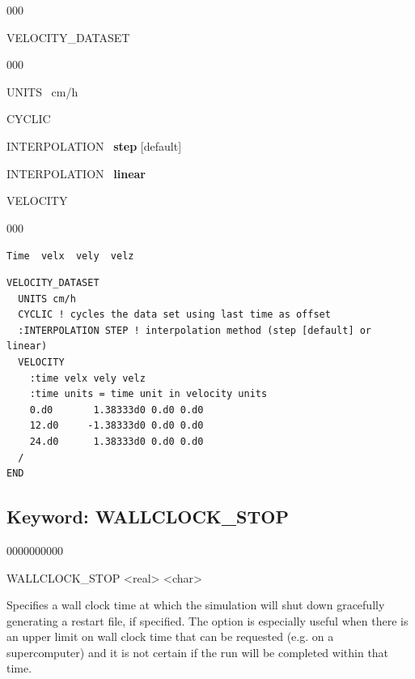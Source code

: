 \documentclass[12pt]{article}
\begin{document}
\begin{deflist}{000}
\item[VELOCITY\_DATASET] ~
\begin{deflist}{000}
\item[UNITS] \ cm/h
\item[CYCLIC]
\item[INTERPOLATION] \ {\bf step} [default]
\item[INTERPOLATION] \ {\bf linear}
\item[VELOCITY] ~
\begin{deflist}{000}
\item[{\tt Time \ velx \ vely \ velz}]
\end{deflist}
\item[\keyend]
\end{deflist}
\item[\keyend]
\end{deflist}


\begin{mdframed}

\begin{verbatim}
VELOCITY_DATASET
  UNITS cm/h
  CYCLIC ! cycles the data set using last time as offset
  :INTERPOLATION STEP ! interpolation method (step [default] or linear)
  VELOCITY
    :time velx vely velz
    :time units = time unit in velocity units
    0.d0       1.38333d0 0.d0 0.d0 
    12.d0     -1.38333d0 0.d0 0.d0 
    24.d0      1.38333d0 0.d0 0.d0 
  /
END
\end{verbatim}

\end{mdframed}

\hyperlink{target_key}{\return}


\newpage
\protect\hypertarget{target_wallclk}{}

\subsection{Keyword: WALLCLOCK\_STOP}
\begin{deflist}{0000000000}
\item[WALLCLOCK\_STOP] <real> <char>
\end{deflist}

 Specifies a wall clock time at which the simulation will shut down gracefully generating a restart file, if specified. The option is especially useful when there is an upper limit on wall clock time that can be requested (e.g. on a supercomputer) and it is not certain if the run will be completed within that time.
\end{document}
